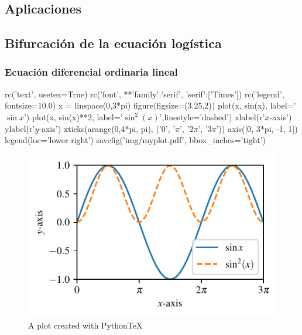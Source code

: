 \begin{partbacktext}
\part{Aplicaciones}

\end{partbacktext}
\chapter{Bifurcación de la ecuación logística}
\section{Ecuación diferencial ordinaria lineal}

\begin{pylabcode}[plotsession]
rc('text', usetex=True)
rc('font', **{'family':'serif', 'serif':['Times']})
rc('legend', fontsize=10.0)
x = linspace(0,3*pi)
figure(figsize=(3.25,2))
plot(x, sin(x), label='$\sin x$')
plot(x, sin(x)**2, label='$\sin^{2}(x)$',linestyle='dashed')
xlabel(r'$x$-axis')
ylabel(r'$y$-axis')
xticks(arange(0,4*pi, pi), ('$0$', '$\pi$', '$2\pi$', '$3\pi$'))
axis([0, 3*pi, -1, 1])
legend(loc='lower right')
savefig('img/myplot.pdf', bbox_inches='tight')
\end{pylabcode}

\begin{figure}[t]
	\sidecaption[t]
	\includegraphics[scale=.65]{./img/myplot}
	\caption{\label{fig:matlpotlib} A plot created with PythonTeX}
\end{figure}